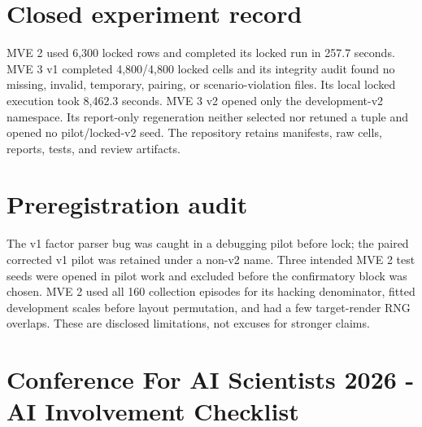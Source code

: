 \documentclass{article}
\begin{document}
\appendix
\section{Closed experiment record}
MVE 2 used 6,300 locked rows and completed its locked run in 257.7 seconds. MVE 3 v1 completed 4,800/4,800 locked cells and its integrity audit found no missing, invalid, temporary, pairing, or scenario-violation files. Its local locked execution took 8,462.3 seconds. MVE 3 v2 opened only the development-v2 namespace. Its report-only regeneration neither selected nor retuned a tuple and opened no pilot/locked-v2 seed. The repository retains manifests, raw cells, reports, tests, and review artifacts.

\section{Preregistration audit}
The v1 factor parser bug was caught in a debugging pilot before lock; the paired corrected v1 pilot was retained under a non-v2 name. Three intended MVE 2 test seeds were opened in pilot work and excluded before the confirmatory block was chosen. MVE 2 used all 160 collection episodes for its hacking denominator, fitted development scales before layout permutation, and had a few target-render RNG overlaps. These are disclosed limitations, not excuses for stronger claims.

\newpage
\section*{Conference For AI Scientists 2026 - AI Involvement Checklist}
\end{document}
